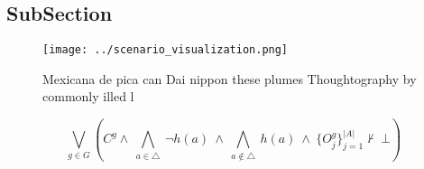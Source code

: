 \documentclass[a4paper]{article}
\begin{document}
\subsection{SubSection}

\begin{figure}
\centering
\texttt{[image: ../scenario\_visualization.png]}
\caption{Mexicana de pica can Dai nippon these plumes Thoughtography by commonly illed l
}
\end{figure}
 
\[\bigvee_{g\in G} (C^g \wedge\ \bigwedge_{a\in \triangle}\ \neg h(a)\ \wedge\ \bigwedge_{a\notin \triangle}\ h(a)\ \wedge\ \{O_j^g\}_{j=1}^{|A|} \nvdash\ \bot )\]
\end{document}
